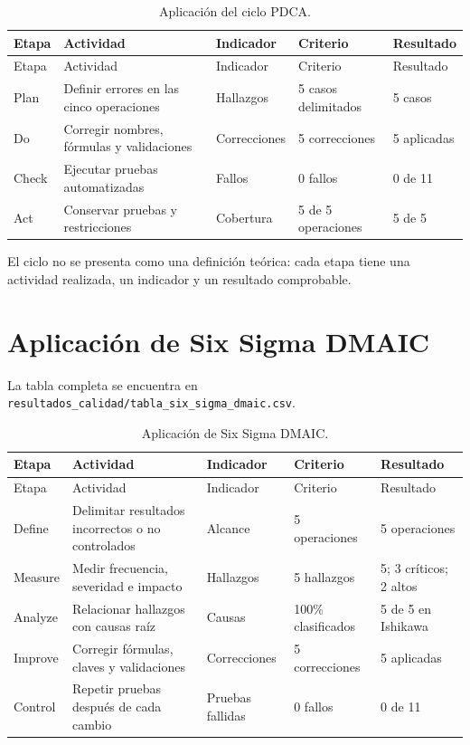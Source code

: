 \documentclass{article}
\begin{document}
\begin{longtable}{p{1.2cm}p{5cm}p{3cm}p{2.5cm}p{2.2cm}}
\caption{Aplicación del ciclo PDCA.}\\
\toprule
Etapa & Actividad & Indicador & Criterio & Resultado \\
\midrule
\endfirsthead
\toprule
Etapa & Actividad & Indicador & Criterio & Resultado \\
\midrule
\endhead
Plan & Definir errores en las cinco operaciones & Hallazgos & 5 casos delimitados & 5 casos \\
Do & Corregir nombres, fórmulas y validaciones & Correcciones & 5 correcciones & 5 aplicadas \\
Check & Ejecutar pruebas automatizadas & Fallos & 0 fallos & 0 de 11 \\
Act & Conservar pruebas y restricciones & Cobertura & 5 de 5 operaciones & 5 de 5 \\
\bottomrule
\end{longtable}

El ciclo no se presenta como una definición teórica: cada etapa tiene una actividad realizada, un indicador y un resultado comprobable.

\section{Aplicación de Six Sigma DMAIC}
La tabla completa se encuentra en \texttt{resultados\_calidad/tabla\_six\_sigma\_dmaic.csv}.

\begin{longtable}{p{1.4cm}p{5cm}p{3cm}p{2.5cm}p{2.2cm}}
\caption{Aplicación de Six Sigma DMAIC.}\\
\toprule
Etapa & Actividad & Indicador & Criterio & Resultado \\
\midrule
\endfirsthead
\toprule
Etapa & Actividad & Indicador & Criterio & Resultado \\
\midrule
\endhead
Define & Delimitar resultados incorrectos o no controlados & Alcance & 5 operaciones & 5 operaciones \\
Measure & Medir frecuencia, severidad e impacto & Hallazgos & 5 hallazgos & 5; 3 críticos; 2 altos \\
Analyze & Relacionar hallazgos con causas raíz & Causas & 100\% clasificados & 5 de 5 en Ishikawa \\
Improve & Corregir fórmulas, claves y validaciones & Correcciones & 5 correcciones & 5 aplicadas \\
Control & Repetir pruebas después de cada cambio & Pruebas fallidas & 0 fallos & 0 de 11 \\
\bottomrule
\end{longtable}
\end{document}
